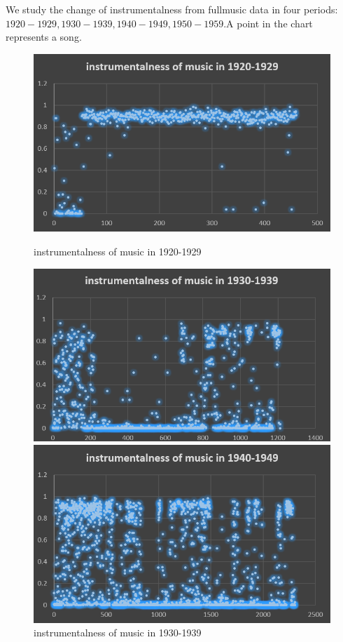\documentclass[conference]{IEEEtran}
\begin{document}
We study the change of instrumentalness from fullmusic data in four periods:$1920-1929,1930-1939,1940-1949,1950-1959$.A point in the chart represents a song.

\begin{figure}[htbp]
	\begin{minipage}[t]{0.5\textwidth}
		\centering
		\includegraphics[scale=0.5]{./img/instrumentalness_of_music_in_1920_1929}
		\caption{instrumentalness of music in 1920-1929\label{fig:instrumentalness1}}
	\end{minipage}
	\begin{minipage}[t]{0.5\textwidth}
		\centering
		\includegraphics[scale=0.5]{./img/instrumentalness_of_music_in_1930_1939}
		\caption{instrumentalness of music in 1930-1939\label{fig:instrumentalness2}}
	\end{minipage}
	\qquad
	\begin{minipage}[t]{0.5\textwidth}
		\centering
		\includegraphics[scale=0.5]{./img/instrumentalness_of_music_in_1940_1949}

\end{minipage}
\end{figure}
\end{document}
